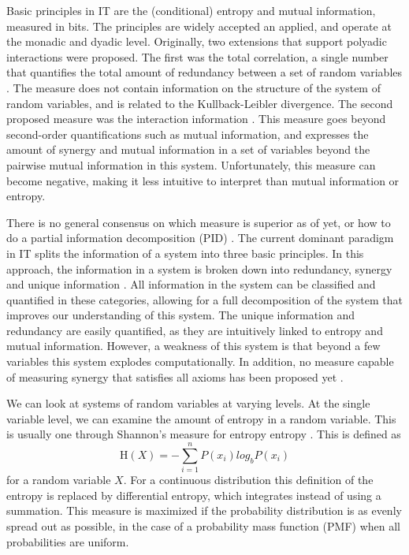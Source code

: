 \documentclass[../main.tex]{subfiles}
\begin{document}
Basic principles in IT are the (conditional) entropy and mutual information, measured in bits.
The principles are widely accepted an applied, and operate at the monadic and dyadic level.
Originally, two extensions that support polyadic interactions were proposed.
The first was the total correlation, a single number that quantifies the total amount of redundancy between a set of random variables \cite{watanabe1960information}. 
The measure does not contain information on the structure of the system of random variables, and is related to the Kullback-Leibler divergence.
The second proposed measure was the interaction information \cite{mcgill1954multivariate}. 
This measure goes beyond second-order quantifications such as mutual information, and expresses the amount of synergy and mutual information in a set of variables beyond the pairwise mutual information in this system. 
Unfortunately, this measure can become negative, making it less intuitive to interpret than mutual information or entropy.

There is no general consensus on which measure is superior as of yet, or how to do a partial information decomposition (PID) \cite{griffith2011quantifying, williams2010nonnegative}.
The current dominant paradigm in IT splits the information of a system into three basic principles.
In this approach, the information in a system is broken down into redundancy, synergy and unique information \cite{williams2010nonnegative}.
All information in the system can be classified and quantified in these categories, allowing for a full decomposition of the system that improves our understanding of this system.
The unique information and redundancy are easily quantified, as they are intuitively linked to entropy and mutual information.
However, a weakness of this system is that beyond a few variables this system explodes computationally.
In addition, no measure capable of measuring synergy that satisfies all axioms has been proposed yet \cite{griffith2011quantifying}.

We can look at systems of random variables at varying levels.
At the single variable level, we can examine the amount of entropy in a random variable.
This is usually one through Shannon's measure for entropy entropy \cite{shannon1949mathematical}.
This is defined as 
%
\begin{equation}
\mathrm{H}(X) = -\sum^n_{i=1} P(x_i) log_b P(x_i)
\end{equation}
%
for a random variable $X$.
For a continuous distribution this definition of the entropy is replaced by differential entropy, which integrates instead of using a summation.
This measure is maximized if the probability distribution is as evenly spread out as possible, in the case of a probability mass function (PMF) when all probabilities are uniform.
\end{document}
